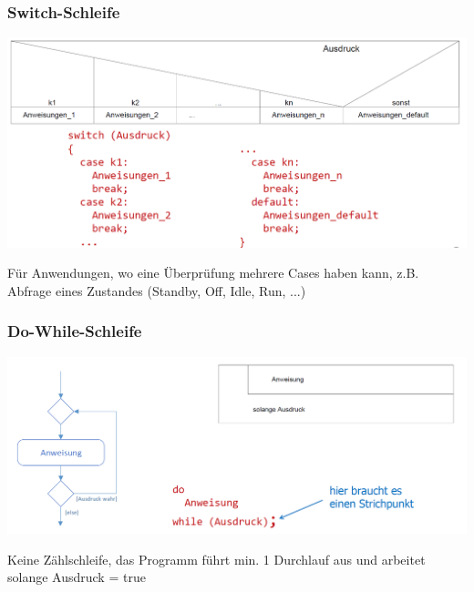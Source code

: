 		\subsubsection{Switch-Schleife}
			\begin{minipage}{.6\linewidth}
				\includegraphics[width=0.95\linewidth]{Bilder/Switch.png}
			\end{minipage}
			\hfill
			\begin{minipage}{.4\linewidth}
				Für Anwendungen, wo eine Überprüfung mehrere Cases haben kann, z.B. Abfrage eines Zustandes (Standby, Off, Idle, Run, ...)
			\end{minipage}

		\subsubsection{Do-While-Schleife}
			\begin{minipage}{.7\linewidth}
				\includegraphics[width=0.95\linewidth]{Bilder/dowhile.png}
			\end{minipage}
			\hfill
			\begin{minipage}{.3\linewidth}
				Keine Zählschleife, das Programm führt min. 1 Durchlauf aus und arbeitet solange Ausdruck = true
			\end{minipage}

